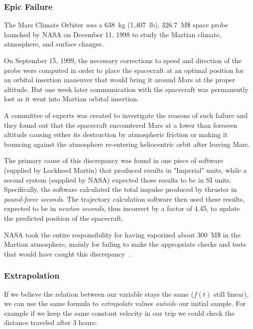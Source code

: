 \begin{curiosity}
\subsubsection{Epic Failure}
The Mars Climate Orbiter \emph{was} a 638~kg (1,407~lb), 326.7~M\$ space probe launched by NASA on December 11, 1998 to study the Martian climate, atmosphere, and surface changes. 

On September 15, 1999, the necessary corrections to speed and direction of the probe were computed in order to place the spacecraft at an optimal position for an orbital insertion maneuver that would bring it around Mars at the proper altitude. 
But one week later communication with the spacecraft was permanently lost as it went into Martian orbital insertion. 

A committee of experts was created to investigate the reasons of 
such failure and they found out that the spacecraft encountered Mars at a lower than foreseen altitude causing either its destruction by atmospheric friction or making it bouncing against the atmosphere re-entering heliocentric orbit after leaving Mars.

The primary cause of this discrepancy was found in one piece of software (supplied by Lockheed Martin) that produced results in "Imperial" units,  while a second system (supplied by NASA) expected those results to be in SI units. Specifically, the software calculated the total impulse produced by thruster in \emph{pound-force seconds}. The trajectory calculation software then used these results, expected to be in \emph{newton seconds}, thus incorrect by a factor of 4.45, to update the predicted position of the spacecraft.
	
NASA took the entire responsibility for having
vaporized about 300~M\$ in the Martian atmosphere, mainly for failing to make the appropriate checks and tests that would have caught this discrepancy~\cite{bib:mars}.	
\end{curiosity}

\subsubsection{Extrapolation}

If we believe the relation between our variable stays the same ($f(t)$ still linear), we can use the same formula to \emph{extrapolate} values \emph{outside} our initial sample. For example if we keep the same constant velocity in our trip we could check the distance traveled after 3 hours:

